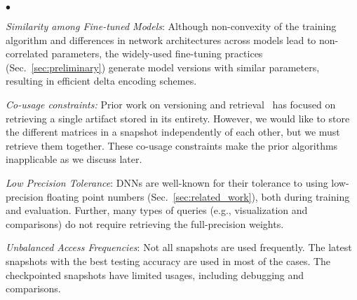 \documentclass[conference]{IEEEtran}
\begin{document}
\begin{list}{$\bullet$}{\leftmargin 0.10in \topsep -2pt} %
\item \emph{Similarity among Fine-tuned Models}: Although non-convexity of the training algorithm and differences in network architectures across models lead to non-correlated parameters, the widely-used fine-tuning practices (Sec.~\ref{sec:preliminary}) generate model versions with similar parameters, resulting in efficient delta encoding schemes.
\item \emph{Co-usage constraints:} Prior work on versioning and retrieval~\cite{vldb15versioning} has focused on retrieving a single artifact stored in its entirety. However, we would like to store the different matrices in a snapshot independently of each other, but we must retrieve them together. These co-usage constraints make the prior algorithms inapplicable as we discuss later.
\item \emph{Low Precision Tolerance}: DNNs are well-known for their tolerance to using low-precision floating point numbers (Sec.~\ref{sec:related_work}), both during training and evaluation. Further, many types of queries (e.g., visualization and comparisons) do not require retrieving the full-precision weights.
\item \emph{Unbalanced Access Frequencies}: Not all snapshots are used frequently. The latest snapshots with the best testing accuracy are used in most of the cases. The checkpointed snapshots have limited usages, including debugging and comparisons. 
\end{list}
\end{document}
